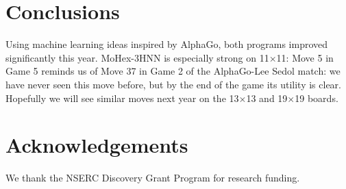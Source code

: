 \documentclass{IOS-Book-Article}
\def\Mt{\mbox{\sc MoHex-3HNN}}
\begin{document}
\section{Conclusions}
Using machine learning ideas inspired by AlphaGo,
both programs improved significantly this year.
\Mt{} is especially strong on 11$\times$11: Move 5 in Game 5 reminds
us of Move 37 in Game 2 of the AlphaGo-Lee Sedol match:
we have never seen this move before, 
but by the end of the game its utility is clear.
Hopefully we will see similar moves next year
on the 13$\times$13 and 19$\times$19 boards.

\section*{Acknowledgements}
We thank the NSERC Discovery Grant Program for research funding.


\end{document}

